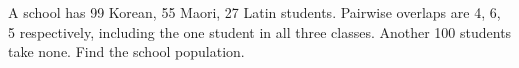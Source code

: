 A school has 99 Korean, 55 Maori, 27 Latin students. Pairwise overlaps are 4, 6, 5 respectively, including the one student in all three classes. Another 100 students take none. Find the school population.
